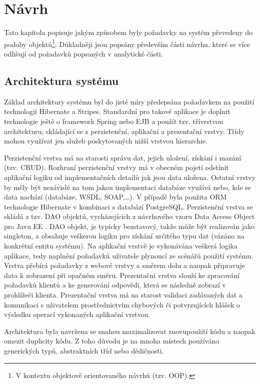 \chapter{Návrh}
Tato kapitola popisuje jakým způsobem byly požadavky na systém převedeny do podoby objektů\footnote{V kontextu objektově orientovaného návrhů (tzv. OOP).}. Důkladněji jsou popsány především části návrhu, které se více odlišují od požadavků popsaných v analytické části.

\section{Architektura systému}
Základ architektury systému byl do jisté míry předepsána požadavkem na použití technologií Hibernate a Stripes. Standardní pro takové aplikace je doplnit technologie ještě o framework Spring nebo EJB a použít tzv. třívrstvou architekturu, skládající se z perzistenční, aplikační a prezentační vrstvy. Třídy mohou využívat jen služeb poskytovaných nižší vrstvou hierarchie.

Perzistenční vrstva má na starosti správu dat, jejich uložení, získání i mazání (tzv. CRUD). Rozhraní perzistenční vrstvy má v obecném pojetí odstínit aplikační logiku od implementačních detailů jak jsou data uložena. Ostatní vrstvy by měly být nezávislé na tom jakou implementaci databáze využívá nebo, kde se data nachází (databáze, WSDL, SOAP,\ldots). V případě \ProjectName byla použita ORM technologie Hibernate v kombinaci s databází PostgreSQL. 
Perzistenční vrstva se skládá z tzv. DAO objektů, vycházejících z návrhového vzoru Data Access Object pro Javu EE . DAO objekt, je typicky bezstavový, takže může být realizován jako singleton, a obsahuje veškerou logiku pro získání určitého typu dat (vázáno na konkrétní entitu systému).
Na aplikační vrstvě je vykonávána veškerá logika aplikace, tedy naplnění požadavků uživatele plynoucí ze scénářů použití systému. Vrstva přebírá požadavky z webové vrstvy a směrem dolu a naopak připravuje data k zobrazení při opačném směru.
Prezentační vrstva slouží ke zpracování požadavků klientů a ke generování odpovědi, která se následně zobrazí v prohlížeči klienta. Prezentační vrstva má na starost validaci zadávaných dat a komunikaci s uživatelem prostřednictvím chybových či potvrzujících hlášek o výsledku operací vykonaných aplikační vrstvou. 

Architektura byla navržena se snahou maximalizovat znovupoužití kódu a naopak omezit duplicity kódu. Z toho důvodu je na mnoha místech používáno generických typů, abstraktních tříd nebo dědičnosti.

